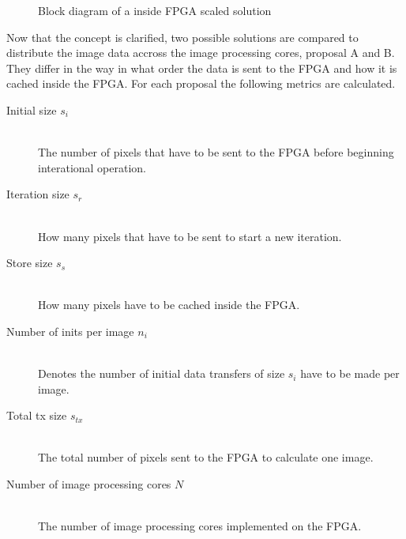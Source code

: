 \begin{figure}[tb!]
    \centering
    \begin{adjustbox}{max width=\linewidth}
        
    \end{adjustbox}
    \caption{Block diagram of a inside FPGA scaled solution}
    \label{fig:insidefpgascaleconceptbd}
\end{figure}

Now that the concept is clarified, two possible solutions are compared to
distribute the image data accross the image processing cores, proposal A and B.
They differ in the way in what order the data is sent to the FPGA and how it is
cached inside the FPGA. For each proposal the following metrics are calculated.

\begin{description}
    \item[Initial size $s_i$]\hfill \\
    The number of pixels that have to be sent to the FPGA before beginning
    interational operation.
    \item[Iteration size $s_r$]\hfill \\
    How many pixels that have to be sent to start a new iteration.
    \item[Store size $s_s$]\hfill \\
    How many pixels have to be cached inside the FPGA.
    \item[Number of inits per image $n_i$]\hfill \\
    Denotes the number of initial data transfers of size $s_i$ have to be made
    per image.
    \item[Total tx size $s_{tx}$]\hfill \\
    The total number of pixels sent to the FPGA to calculate one image.
    \item[Number of image processing cores $N$]\hfill \\
    The number of image processing cores implemented on the FPGA.
\end{description}


